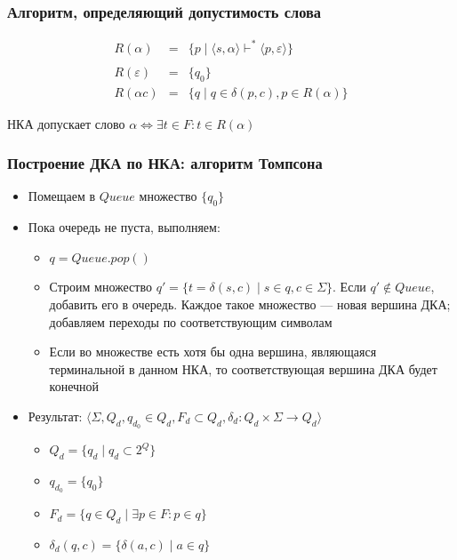 \documentclass{beamer}
\def\iff{\Leftrightarrow}
\begin{document}
\begin{frame}[fragile]
  \transwipe[direction=90]
  \frametitle{Алгоритм, определяющий допустимость слова}

\[
\begin{array}{rcl}
  R(\alpha)      &=& \{ p \mid \langle s, \alpha \rangle \vdash^* \langle p, \varepsilon \rangle\} \\
  & & \\
  R(\varepsilon) &=& \{q_0\} \\
  R(\alpha c)    &=& \{q \mid q \in \delta (p, c), p \in R(\alpha)\}
\end{array}
\]

\vspace{20pt}

\begin{center}
  НКА допускает слово $\alpha \iff \exists t \in F : t \in R(\alpha) $
\end{center}

\end{frame}

\begin{frame}[fragile]
  \transwipe[direction=90]
  \frametitle{Построение ДКА по НКА: алгоритм Томпсона}
  \begin{itemize}
    \item Помещаем в $Queue$ множество $\{ q_0 \}$
    \item Пока очередь не пуста, выполняем:
    \begin{itemize}
      \item $q = Queue.pop()$
      \item Строим множество $q' = \{t = \delta (s, c) \mid s \in q, c \in \Sigma\}$. Если $q' \notin Queue$, добавить его в очередь. Каждое такое множество --- новая вершина ДКА; добавляем переходы по соответствующим символам
      \item Если во множестве есть хотя бы одна вершина, являющаяся терминальной в данном НКА, то соответствующая вершина ДКА будет конечной
    \end{itemize}
  \item Результат: $\langle \Sigma, Q_d, q_{d_0} \in Q_d, F_d \subset Q_d, \delta_d: Q_d \times \Sigma \rightarrow {Q_d} \rangle$
  \begin{itemize}
    \item $Q_d = \{q_d \mid q_d \subset 2^Q \}$
    \item $q_{d_0} = \{q_0\}$
    \item $F_d = \{q \in Q_d \mid \exists p \in F : p \in q\}$
    \item $\delta_d(q, c) = \{ \delta(a, c) \mid a \in q \}$
  \end{itemize}
  \end{itemize}
\end{frame}
\end{document}
